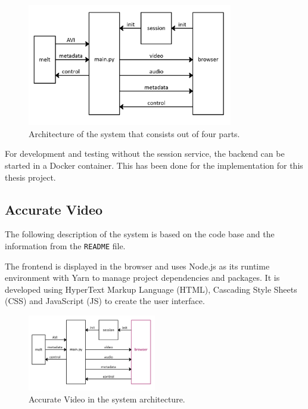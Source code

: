 \documentclass[../MasterThesis.tex]{subfiles}
\begin{document}
\begin{figure}[H]
	\centering
	\includegraphics[width=0.8\textwidth]{IM3.png}
	\caption[Architecture of the system that consists out of four parts.]{Architecture of the system that consists out of four parts.}
	\label{figure:SA}
\end{figure}


For development and testing without the session service, the backend can be started in a Docker container. This has been done for the implementation for this thesis project.







\subsection{Accurate Video} \label{subsection:accuratevideo}

The following description of the system is based on the code base and the information from the \texttt{README} file.~\cite{RM_Frontend}

The frontend is displayed in the browser and uses Node.js as its runtime environment with Yarn to manage project dependencies and packages. It is developed using HyperText Markup Language (HTML), Cascading Style Sheets (CSS) and JavaScript (JS) to create the user interface.


\begin{figure}[H]
	\centering
	\includegraphics[width=0.5\textwidth]{IM_FE.png}
	\caption{Accurate Video in the system architecture.}
	\label{figure:AS_frontend}
\end{figure}
\end{document}
